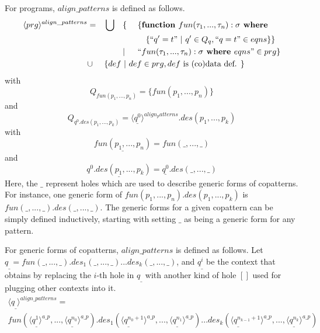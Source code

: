 For programs, $align\_patterns$ is defined as follows.
\begin{alignat*}{4}
\langle prg \rangle^{align\_patterns} & = &&\bigcup &&\{ ~&&\{ \textrm{\textbf{function }} fun(\tau_1, ..., \tau_n): \sigma \textrm{\textbf{ where }} \\
& && && &&\quad \{ `` q' = t " ~ | ~ q' \in Q_q, `` q = t " \in eqns \} \} \\
& && && | && `` fun (\tau_1, ..., \tau_n): \sigma \textrm{\textbf{ where }} eqns " \in prg \} \\
& \cup && \{ def ~ | ~ def \in prg, def \textrm{ is (co)data def. } \} \span\span\span\span
\end{alignat*}
with
\begin{equation*}
Q_{fun(p_1, ..., p_n)} = \{fun(p_1, ..., p_n)\}
\end{equation*}
and
\begin{equation*}
Q_{q^0.des(p_1, ..., p_k)} = \langle \underline{q^0} \rangle^{align_patterns}.des(p_1, ..., p_k)
\end{equation*}
with
\begin{equation*}
\underline{fun(p_1, ..., p_n)} = fun(\_, ..., \_)
\end{equation*}
and
\begin{equation*}
\underline{q^0.des(p_1, ..., p_k)} = \underline{q^0}.des(\_, ..., \_)
\end{equation*}
Here, the $\_$ represent holes which are used to describe generic forms of copatterns. For instance, one generic form of $fun(p_1, ..., p_n).des(p_1, ..., p_k)$ is $fun(\_, ..., \_).des(\_, ..., \_)$. The generic forms for a given copattern can be simply defined inductively, starting with setting $\_$ as being a generic form for any pattern.

For generic forms of copatterns, $align\_patterns$ is defined as follows. Let $q_\_ = fun(\_, ..., \_).des_1(\_, ..., \_)...des_k(\_, ..., \_)$, and $q^i_\_$ be the context that obtains by replacing the $i$-th hole in $q_\_$ with another kind of hole $[]$ used for plugging other contexts into it.
\begin{multline*}
\langle q_\_ \rangle^{align\_patterns} = \\
fun(\langle q^1_\_ \rangle^{a\_p}, ..., \langle q^{n_0}_\_ \rangle^{a\_p}).des_1(\langle q^{n_0 + 1}_\_ \rangle^{a\_p}, ..., \langle q^{n_1}_\_ \rangle^{a\_p})...des_k(\langle q^{n_{k-1} + 1}_\_ \rangle^{a\_p}, ..., \langle q^{n_k}_\_ \rangle^{a\_p})
\end{multline*}

